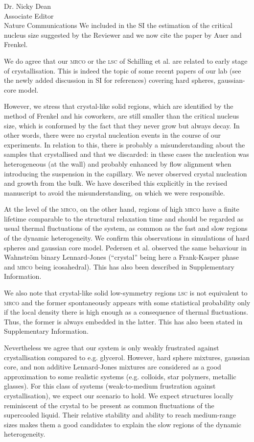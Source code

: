 \documentclass[a4paper, rebuttal, parskip=true, firsthead=false, fromemail=true, foldmarks=false]{scrlttr2}
\begin{document}
\begin{letter}{Dr. Nicky Dean\\
Associate Editor\\
Nature Communications}
We included in the SI the estimation of the critical nucleus size suggested by the Reviewer and we now cite the paper by Auer and Frenkel.

We do agree that our \textsc{mrco} or the \textsc{lsc} of Schilling et al. are related to early stage of crystallisation. This is indeed the topic of some recent papers of our lab (see the newly added discussion in SI for references) covering hard spheres, gaussian-core model. 

However, we stress that crystal-like solid regions, which are identified by the method of Frenkel and his coworkers, are still smaller than the critical nucleus size, which is conformed by the fact that they never grow but always decay. In other words, there were no crystal nucleation events in the course of our experiments. In relation to this, there is probably a misunderstanding about the samples that crystallised and that we discarded: in these cases the nucleation was heterogeneous (at the wall) and probably enhanced by flow alignment when introducing the suspension in the capillary. We never observed crystal nucleation and growth from the bulk. We have described this explicitly in the revised manuscript to avoid the misunderstanding, on which we were responsible. 

At the level of the \textsc{mrco}, on the other hand, regions of high \textsc{mrco} have a finite lifetime comparable to the structural relaxation time and should be regarded as  usual thermal fluctuations of the system, as common as the fast and slow regions of the dynamic heterogeneity. We confirm this observations in simulations of hard spheres and gaussian core model. Pedersen et al. observed the same behaviour in Wahnstr\"om binary Lennard-Jones (``crystal'' being here a Frank-Kasper phase and \textsc{mrco} being icosahedral). This has also been described in Supplementary Information. 

We also note that crystal-like solid low-symmetry regions \textsc{lsc} is not equivalent to \textsc{mrco} and the former spontaneously appears with some statistical probability only if the local density there is high enough as a consequence of thermal fluctuations. Thus, the former is always embedded in the latter. This has also been stated in Supplementary Information.

Nevertheless we agree that our system is only weakly frustrated against crystallisation compared to e.g. glycerol. However, hard sphere mixtures, gaussian core, and non additive Lennard-Jones mixtures are considered as a good approximation to some realistic systems (e.g. colloids, star polymers, metallic glasses). For this class of systems (weak-to-medium frustration against crystallisation), we expect our scenario to hold. We expect structures locally reminiscent of the crystal to be present as common fluctuations of the supercooled liquid. Their relative stability and ability to reach medium-range sizes makes them a good candidates to explain the slow regions of the dynamic heterogeneity.


\end{letter}
\end{document}
